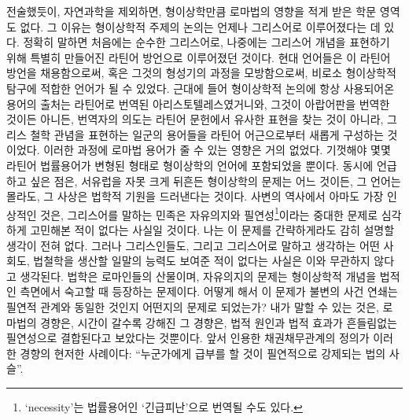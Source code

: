 전술했듯이,
자연과학을 제외하면,
형이상학만큼 로마법의 영향을 적게 받은 학문 영역도 없다.
그 이유는 형이상학적 주제의 논의는 언제나 그리스어로 이루어졌다는 데 있다.
정확히 말하면 처음에는 순수한 그리스어로,
나중에는 그리스어 개념을 표현하기 위해 특별히 만들어진 라틴어 방언으로
이루어졌던 것이다.
현대 언어들은 이 라틴어 방언을 채용함으로써,
혹은 그것의 형성기의 과정을 모방함으로써,
비로소
형이상학적 탐구에 적합한 언어가 될 수 있었다.
근대에 들어 형이상학적 논의에 항상 사용되어온 용어의 출처는
라틴어로 번역된 아리스토텔레스였거니와,
그것이 아랍어판을 번역한 것이든 아니든,
번역자의 의도는
라틴어 문헌에서 유사한 표현을 찾는 것이 아니라,
그리스 철학 관념을 표현하는 일군의 용어들을
라틴어 어근으로부터
새롭게 구성하는 것이었다.
이러한 과정에 로마법 용어가 줄 수 있는 영향은 거의 없었다.
기껏해야 몇몇 라틴어 법률용어가 변형된 형태로
형이상학의 언어에 포함되었을 뿐이다.
동시에 언급하고 싶은 점은,
서유럽을 자못 크게 뒤흔든 형이상학의 문제는 어느 것이든,
그 언어는 몰라도,
그 사상은 법학적 기원을 드러낸다는 것이다.
사변의 역사에서 아마도 가장 인상적인 것은,
그리스어를 말하는 민족은
자유의지와 필연성\footnote{%
  `necessity'는 법률용어인 `긴급피난'으로 번역될 수도 있다.
}이라는 중대한 문제로 심각하게 고민해본 적이 없다는 사실일 것이다.
나는 이 문제를 간략하게라도 감히 설명할 생각이 전혀 없다.
그러나 그리스인들도, 그리고 그리스어로 말하고 생각하는 어떤 사회도,
법철학을 생산할 일말의 능력도 보여준 적이 없다는 사실은
이와 무관하지 않다고 생각된다.
법학은 로마인들의 산물이며,
자유의지의 문제는 형이상학적 개념을 법적인 측면에서 숙고할 때 등장하는
문제이다.
어떻게 해서 이 문제가
불변의 사건 연쇄는 필연적 관계와 동일한 것인지 어떤지의
문제로 되었는가?
내가 말할 수 있는 것은,
로마법의 경향은,
시간이 갈수록 강해진 그 경향은,
법적 원인과 법적 효과가
흔들림없는
필연성으로 결합된다고
보았다는 것뿐이다.
앞서 인용한 채권채무관계의 정의가 이러한 경향의 현저한 사례이다:
``누군가에게 급부를 할 것이 필연적으로 강제되는
법의 사슬''.

